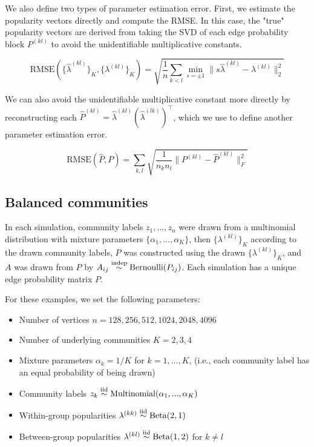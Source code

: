 \documentclass[12pt]{article}
\providecommand{\tightlist}{%
  \setlength{\itemsep}{0pt}\setlength{\parskip}{0pt}}
\begin{document}
We also define two types of parameter estimation error. 
First, we estimate the popularity vectors directly and compute the RMSE. 
In this case, the "true" popularity vectors are derived from 
taking the SVD of each edge probability block $P^{(kl)}$ 
to avoid the unidentifiable multiplicative constants. 

\[\text{RMSE}(\{\hat{\lambda}^{(kl)}\}_K, \{\lambda^{(kl)}\}_K) = 
\sqrt{\frac{1}{n} \sum_{k < l} \min_{s = \pm 1} 
\|s \hat{\lambda}^{(kl)} - \lambda^{(kl)} \|_2^2}\]

We can also avoid the unidentifiable multiplicative constant more directly 
by reconstructing each 
$\hat{P}^{(kl)} = \hat{\lambda}^{(kl)} (\hat{\lambda}^{(lk)})^\top$, 
which we use to define another parameter estimation error. 

\[\text{RMSE}(\hat{P}, P) =
\sum_{k,l} \sqrt{\frac{1}{n_k n_l} \|P^{(kl)} - \hat{P}^{(kl)}\|_F^2}\]

\hypertarget{balanced-communities}{%
\subsection{Balanced communities}\label{balanced-communities}}

In each simulation, community labels \(z_1, ..., z_n\) were drawn from a
multinomial distribution with mixture parameters
\(\{\alpha_1, ..., \alpha_K\}\), then \(\{\lambda^{(kl)}\}_K\) according
to the drawn community labels, \(P\) was constructed using the drawn
\(\{\lambda^{(kl)}\}_K\), and \(A\) was drawn from \(P\) by
\(A_{ij} \stackrel{\mathrm{indep}}{\sim} \mathrm{Bernoulli}(P_{ij})\). Each simulation has
a unique edge probability matrix \(P\).

For these examples, we set the following parameters:

\begin{itemize}
\tightlist
\item
  Number of vertices \(n = 128, 256, 512, 1024, 2048, 4096\)
\item
  Number of underlying communities \(K = 2, 3, 4\)
\item
  Mixture parameters \(\alpha_k = 1 / K\) for \(k = 1, ..., K\), (i.e.,
  each community label has an equal probability of being drawn)
\item
  Community labels
  \(z_k \stackrel{\text{iid}}{\sim} \mathrm{Multinomial}(\alpha_1, ..., \alpha_K)\)
\item
  Within-group popularities
  \(\lambda^{(kk)} \stackrel{\text{iid}}{\sim} \mathrm{Beta}(2, 1)\)
\item
  Between-group popularities
  \(\lambda^{(kl)} \stackrel{\text{iid}}{\sim} \mathrm{Beta}(1, 2)\) for
  \(k \neq l\)
\end{itemize}
\end{document}

